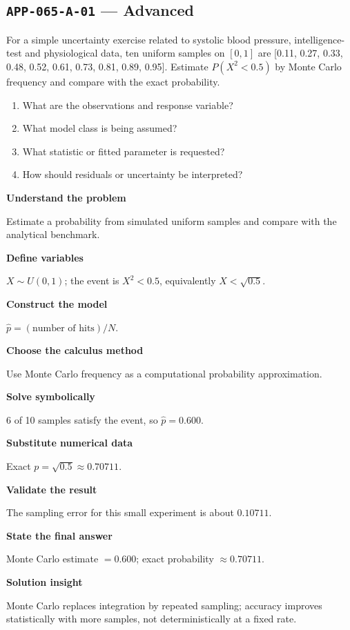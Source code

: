 \documentclass[11pt]{book}
\newcommand{\pid}[1]{\texttt{#1}}
\begin{document}
\subsection*{\pid{APP-065-A-01} — Advanced}
\begin{problembox}
For a simple uncertainty exercise related to systolic blood pressure, intelligence-test and physiological data, ten uniform samples on $[0,1]$ are [0.11, 0.27, 0.33, 0.48, 0.52, 0.61, 0.73, 0.81, 0.89, 0.95]. Estimate $P(X^2<0.5)$ by Monte Carlo frequency and compare with the exact probability.
\end{problembox}
\begin{promptbox}\begin{enumerate}
\item What are the observations and response variable?
\item What model class is being assumed?
\item What statistic or fitted parameter is requested?
\item How should residuals or uncertainty be interpreted?
\end{enumerate}\end{promptbox}
\begin{solutionbox}
\textbf{Understand the problem}\par Estimate a probability from simulated uniform samples and compare with the analytical benchmark.\par\medskip
\textbf{Define variables}\par $X\sim U(0,1)$; the event is $X^2<0.5$, equivalently $X<\sqrt{0.5}$.\par\medskip
\textbf{Construct the model}\par $\widehat p=(\text{number of hits})/N$.\par\medskip
\textbf{Choose the calculus method}\par Use Monte Carlo frequency as a computational probability approximation.\par\medskip
\textbf{Solve symbolically}\par 6 of 10 samples satisfy the event, so $\widehat p=0.600$.\par\medskip
\textbf{Substitute numerical data}\par Exact $p=\sqrt{0.5}\approx 0.70711$.\par\medskip
\textbf{Validate the result}\par The sampling error for this small experiment is about $0.10711$.\par\medskip
\textbf{State the final answer}\par Monte Carlo estimate $=0.600$; exact probability $\approx 0.70711$.\par\medskip
\textbf{Solution insight}\par Monte Carlo replaces integration by repeated sampling; accuracy improves statistically with more samples, not deterministically at a fixed rate.\par\medskip
\end{solutionbox}
\end{document}

